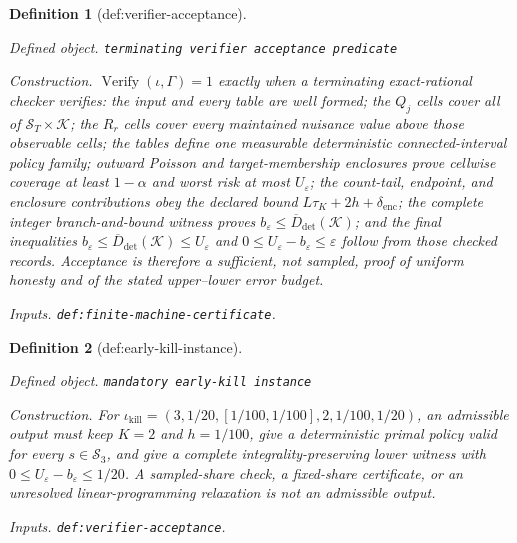 \documentclass{article}
\newtheorem{definition}{Definition}
\begin{document}
\begin{definition}[def:verifier-acceptance]\label{def:verifier-acceptance}
\par\smallskip\noindent\emph{Defined object.} \texttt{terminating verifier acceptance predicate}
\par\smallskip\noindent\emph{Construction.} \(\operatorname{Verify}(\iota,\Gamma)=1\) exactly when a terminating exact-rational checker verifies: the input and every table are well formed; the \(Q_j\) cells cover all of \(\mathcal S_T\times\mathcal K\); the \(R_r\) cells cover every maintained nuisance value above those observable cells; the tables define one measurable deterministic connected-interval policy family; outward Poisson and target-membership enclosures prove cellwise coverage at least \(1-\alpha\) and worst risk at most \(U_\varepsilon\); the count-tail, endpoint, and enclosure contributions obey the declared bound \(L\tau_K+2h+\delta_{\mathrm{enc}}\); the complete integer branch-and-bound witness proves \(b_\varepsilon\le\overline D_{\mathrm{det}}(\mathcal K)\); and the final inequalities \(b_\varepsilon\le\overline D_{\mathrm{det}}(\mathcal K)\le U_\varepsilon\) and \(0\le U_\varepsilon-b_\varepsilon\le\varepsilon\) follow from those checked records. Acceptance is therefore a sufficient, not sampled, proof of uniform honesty and of the stated upper--lower error budget.
\par\smallskip\noindent\emph{Inputs.} \texttt{def:\allowbreak{}finite-\allowbreak{}machine-\allowbreak{}certificate}.
\end{definition}

\begin{definition}[def:early-kill-instance]\label{def:early-kill-instance}
\par\smallskip\noindent\emph{Defined object.} \texttt{mandatory early-\allowbreak{}kill instance}
\par\smallskip\noindent\emph{Construction.} For \(\iota_{\mathrm{kill}}=(3,1/20,[1/100,1/100],2,1/100,1/20)\), an admissible output must keep \(K=2\) and \(h=1/100\), give a deterministic primal policy valid for every \(s\in\mathcal S_3\), and give a complete integrality-preserving lower witness with \(0\le U_\varepsilon-b_\varepsilon\le1/20\). A sampled-share check, a fixed-share certificate, or an unresolved linear-programming relaxation is not an admissible output.
\par\smallskip\noindent\emph{Inputs.} \texttt{def:\allowbreak{}verifier-\allowbreak{}acceptance}.
\end{definition}
\end{document}

